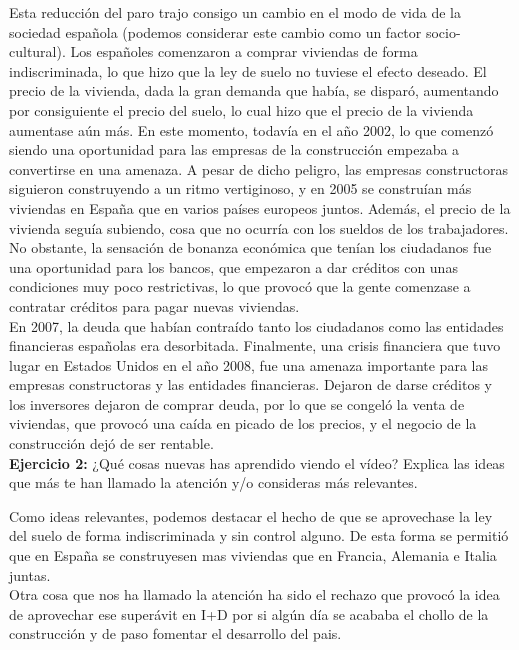 \documentclass[11pt]{article}
\theoremstyle{plain}
\theoremstyle{definition}
\begin{document}
Esta reducción del paro trajo consigo un cambio en el modo de vida de
la sociedad española (podemos considerar este cambio como un factor
socio-cultural). Los españoles comenzaron a comprar viviendas de forma
indiscriminada, lo que hizo que la ley de suelo no tuviese el efecto
deseado. El precio de la vivienda, dada la gran demanda que había, se
disparó, aumentando por consiguiente el precio del suelo, lo cual hizo
que el precio de la vivienda aumentase aún más. En este momento,
todavía en el año 2002, lo que comenzó siendo una oportunidad para las
empresas de la construcción empezaba a convertirse en una amenaza. A
pesar de dicho peligro, las empresas constructoras siguieron
construyendo a un ritmo vertiginoso, y en 2005 se construían más
viviendas en España que en varios países europeos juntos. Además, el
precio de la vivienda seguía subiendo, cosa que no ocurría con los
sueldos de los trabajadores. No obstante, la sensación de bonanza
económica que tenían los ciudadanos fue una oportunidad para los
bancos, que empezaron a dar créditos con unas condiciones muy poco
restrictivas, lo que provocó que la gente comenzase a contratar
créditos
para pagar nuevas viviendas.\\

En 2007, la deuda que habían contraído tanto los ciudadanos como las
entidades financieras españolas era desorbitada. Finalmente, una
crisis financiera que tuvo lugar en Estados Unidos en el año 2008, fue
una amenaza importante para las empresas constructoras y las entidades
financieras. Dejaron de darse créditos y los inversores dejaron de
comprar deuda, por lo que se congeló la venta de viviendas, que provocó
una caída en picado de los precios, y el negocio de la construcción
dejó de ser rentable.\\

\textbf{Ejercicio 2:} ¿Qué cosas nuevas has aprendido viendo el vídeo?
Explica las ideas que más te han llamado la atención y/o consideras
más relevantes.

Como ideas relevantes, podemos destacar el hecho de que se aprovechase 
la ley del suelo de forma indiscriminada y sin control alguno. De esta 
forma se permitió que en España se construyesen mas viviendas que en 
Francia, Alemania e Italia juntas.\\

Otra cosa que nos ha llamado la atención ha sido el rechazo que provocó 
la idea de aprovechar ese superávit en I+D por si algún día se acababa
el chollo de la construcción y de paso fomentar el desarrollo del pais.
\end{document}
